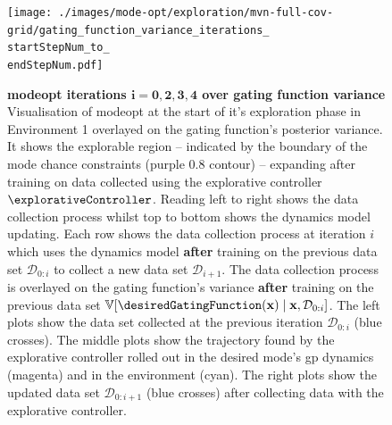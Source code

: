 \documentclass{mimosis-class/mimosis}
\numberwithin{equation}{chapter}
\newcommand{\state}{\ensuremath{\mathbf{x}}}
\newcommand{\dataset}{\ensuremath{\mathcal{D}}}
\newcommand{\modeVar}{\ensuremath{\alpha}}
\begin{document}
{\renewcommand{\startStepNum}{0}
\renewcommand{\endStepNum}{4}
\begin{figure}
\centering
\texttt{[image: ./images/mode-opt/exploration/mvn-full-cov-grid/gating\_function\_variance\_iterations\_\\startStepNum\_to\_\\endStepNum.pdf]}
\caption[\acrshort{modeopt} iterations $\mathbf{i=0, 2, 3, 4}$ over gating function variance]{\textbf{\acrshort{modeopt} iterations $\mathbf{i=0, 2, 3, 4}$ over gating function variance}
Visualisation of \acrshort{modeopt} at the start of it's exploration phase in Environment 1 overlayed
on the gating function's posterior variance.
It shows the explorable region -- indicated by the boundary of the mode chance constraints (purple 0.8 contour)
-- expanding after training on data collected using the explorative controller $\explorativeController$.
Reading left to right shows the data collection process whilst top to bottom shows the dynamics model updating.
Each row shows the data collection process at iteration $i$ which uses the dynamics model
\textbf{after} training on the previous data set $\mathcal{D}_{0:i}$ to collect a new data set $\dataset_{i+1}$.
The data collection process is overlayed on the gating function's variance \textbf{after} training on the previous
data set $\mathbb{V}[\desiredGatingFunction(\state) \mid \state, \dataset_{0:i}]$.
The left plots show the data set collected at the previous iteration $\dataset_{0:i}$ (blue crosses).
The middle plots show the trajectory found by the explorative controller rolled out in the desired mode's \acrshort{gp}
dynamics (magenta) and in the environment (cyan).
The right plots show the updated data set $\dataset_{0:i+1}$ (blue crosses) after collecting data with the explorative
controller.}
\label{fig-explorative-traj-opt-over-variance-7-\startStepNum-\endStepNum}
\end{figure}

\newline

}
\end{document}
